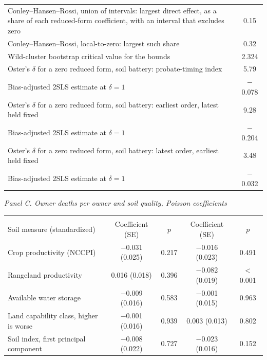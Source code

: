 \begin{table}[H]
\begin{tabular*}{\textwidth}{@{\extracolsep{\fill}}p{12.2cm}c}
Conley--Hansen--Rossi, union of intervals: largest direct effect, as a share of each reduced-form coefficient, with an interval that excludes zero & 0.15 \\
Conley--Hansen--Rossi, local-to-zero: largest such share & 0.32 \\
Wild-cluster bootstrap critical value for the bounds & 2.324 \\
Oster's $\delta$ for a zero reduced form, soil battery: probate-timing index & 5.79 \\
\quad Bias-adjusted 2SLS estimate at $\delta=1$ & $-$0.078 \\
Oster's $\delta$ for a zero reduced form, soil battery: earliest order, latest held fixed & 9.28 \\
\quad Bias-adjusted 2SLS estimate at $\delta=1$ & $-$0.204 \\
Oster's $\delta$ for a zero reduced form, soil battery: latest order, earliest held fixed & 3.48 \\
\quad Bias-adjusted 2SLS estimate at $\delta=1$ & $-$0.032 \\
\bottomrule \end{tabular*}
\vspace{0.6em}
\noindent\textit{Panel C. Owner deaths per owner and soil quality, Poisson coefficients}\par\smallskip
\begin{tabular*}{\textwidth}{@{\extracolsep{\fill}}>{\raggedright\arraybackslash}p{6.0cm}cccc}
\toprule &  &  \\
\cmidrule(lr){2-3}\cmidrule(lr){4-5} Soil measure (standardized) & Coefficient (SE) & $p$ & Coefficient (SE) & $p$ \\ \midrule
Crop productivity (NCCPI) & $-$0.031 (0.025) & 0.217 & $-$0.016 (0.023) & 0.491 \\
Rangeland productivity & 0.016 (0.018) & 0.396 & $-$0.082 (0.019) & $<$0.001 \\
Available water storage & $-$0.009 (0.016) & 0.583 & $-$0.001 (0.015) & 0.963 \\
Land capability class, higher is worse & $-$0.001 (0.016) & 0.939 & 0.003 (0.013) & 0.802 \\
Soil index, first principal component & $-$0.008 (0.022) & 0.727 & $-$0.023 (0.016) & 0.152 \\

\end{tabular*}
\end{table}
